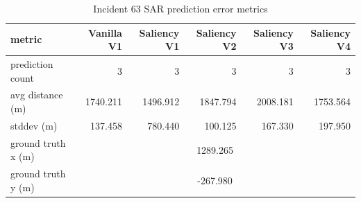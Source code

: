 \begin{table}[ht]
\centering
\caption{Incident 63 SAR prediction error metrics}
\label{tab:sar-incident-63}
\begin{tabular}{lrrrrr}
\hline
metric & Vanilla V1 & Saliency V1 & Saliency V2 & Saliency V3 & Saliency V4 \\
\hline
prediction count & 3 & 3 & 3 & 3 & 3 \\
avg distance (m) & 1740.211 & 1496.912 & 1847.794 & 2008.181 & 1753.564 \\
stddev (m) & 137.458 & 780.440 & 100.125 & 167.330 & 197.950 \\
ground truth x (m) & \multicolumn{5}{c}{1289.265} \\
ground truth y (m) & \multicolumn{5}{c}{-267.980} \\
\hline
\end{tabular}
\end{table}
